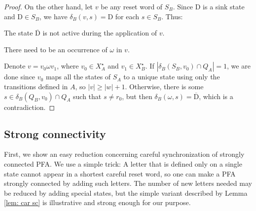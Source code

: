\documentclass{ws-ijmpc}
\begin{document}
\begin{proof}
On the other hand, let $v$ be any reset word of $S_{B}$. Since $\mathrm{D}$
is a sink state and $\mathrm{D}\in S_{B}$, we have $\delta_{B}\!\left(v,s\right)=\mathrm{D}$
for each $s\in S_{B}$. Thus:
\begin{itemlist}
\item The state $\overline{\mathrm{D}}$ is not active during the application
of $v$.
\item There need to be an occurrence of $\omega$ in $v$. 
\end{itemlist}
Denote $v=v_{0}\omega v_{1}$, where $v_{0}\in X_{A}^{\star}$ and
$v_{1}\in X_{B}^{\star}$. If $\left|\delta_{B}\!\left(S_{B},v_{0}\right)\cap Q_{A}\right|=1$,
we are done since $v_{0}$ maps all the states of $S_{A}$ to a unique
state using only the transitions defined in $A$, so $\left|v\right|\ge\left|w\right|+1$.
Otherwise, there is some $s\in\delta_{B}\!\left(Q_{B},v_{0}\right)\cap Q_{A}$
such that $s\neq r_{0}$, but then $\delta_{B}\!\left(\omega,s\right)=\overline{\mathrm{D}}$,
which is a contradiction.
\end{proof}

\subsection{Strong connectivity\label{sub:Strong-connectivity}}

First, we show an easy reduction concerning careful synchronization
of strongly connected PFA. We use a simple trick: A letter that is
defined only on a single state cannot appear in a shortest careful
reset word, so one can make a PFA strongly connected by adding such
letters. The number of new letters needed may be reduced by adding
special states, but the simple variant described by Lemma \ref{lem: car sc}
is illustrative and strong enough for our purpose.
\end{document}
